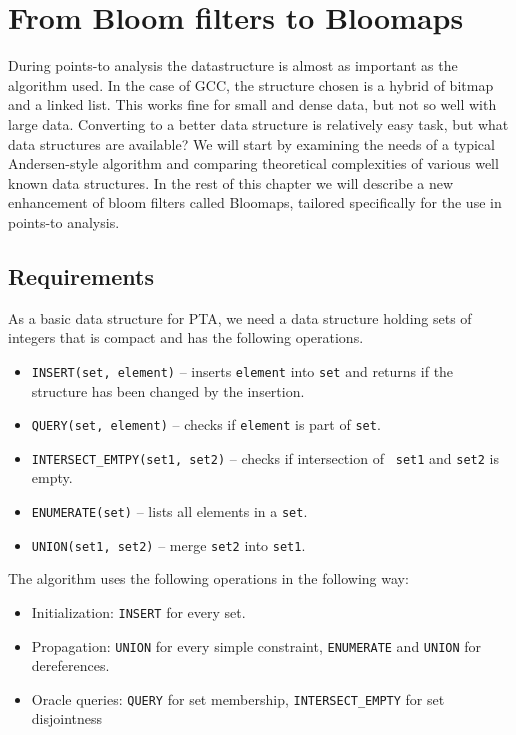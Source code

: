 \chapter{From Bloom filters to Bloomaps}

During points-to analysis the datastructure is almost as important as the
algorithm used. In the case of GCC, the structure chosen is a hybrid of bitmap
and a linked list. This works fine for small and dense data, but not so well
with large data. Converting to a better data structure is relatively easy task, but what data
structures are available? We will start by examining the needs of a typical
Andersen-style algorithm and comparing theoretical complexities of various well
known data structures. In the rest of this chapter we will describe a new
enhancement of bloom filters called Bloomaps, tailored specifically for the use
in points-to analysis.

\section{Requirements}

As a basic data structure for PTA, we need a data structure holding sets of
integers that is compact and has the following operations.

\begin{itemize}
	\item {\tt INSERT(set, element)} -- inserts {\tt element} into {\tt set} and returns if
		the structure has been changed by the insertion.
	\item {\tt QUERY(set, element)} -- checks if {\tt element} is part of {\tt set}.
	\item {\tt INTERSECT\_EMTPY(set1, set2)} -- checks if intersection of {\tt
		set1} and {\tt set2} is empty.
	\item {\tt ENUMERATE(set)} -- lists all elements in a {\tt set}.
	\item {\tt UNION(set1, set2)} -- merge {\tt set2} into {\tt set1}.
\end{itemize}

The algorithm uses the following operations in the following way:

\begin{itemize}
	\item Initialization: {\tt INSERT} for every set.
	\item Propagation: {\tt UNION} for every simple constraint, {\tt ENUMERATE} and
		{\tt UNION} for dereferences.
	\item Oracle queries: {\tt QUERY} for set membership, {\tt INTERSECT\_EMPTY}
		for set disjointness
\end{itemize}

